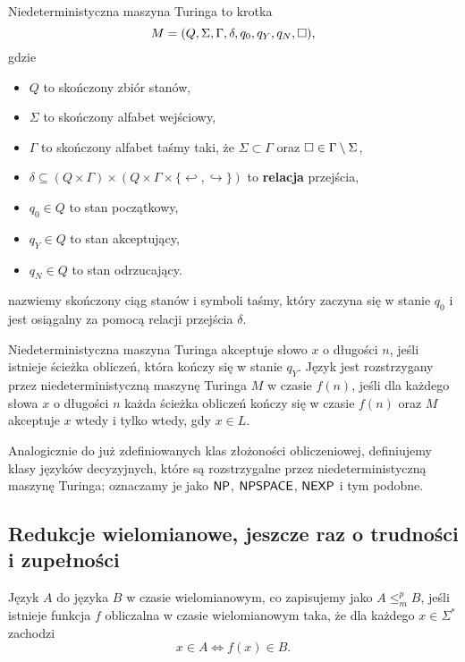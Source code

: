 \begin{definition}
    Niedeterministyczna maszyna Turinga to krotka
    \[ M = (Q, \Sigma, \Gamma, \delta, q_0, q_Y, q_N, \square),\]
    gdzie
    \begin{itemize}[noitemsep]
        \item $Q$ to skończony zbiór stanów,
        \item $\Sigma$ to skończony alfabet wejściowy,
        \item $\Gamma$ to skończony alfabet taśmy taki, że $\Sigma \subset \Gamma$ oraz $\square \in \Gamma \setminus \Sigma$,
        \item $\delta \subseteq \left(Q \times \Gamma\right) \times \left(Q \times \Gamma \times \{\hookleftarrow , \hookrightarrow\}\right)$ to \textbf{relacja}  przejścia,
        \item $q_0 \in Q$ to stan początkowy,
        \item $q_Y \in Q$ to stan akceptujący,
        \item $q_N \in Q$ to stan odrzucający.
    \end{itemize}

     nazwiemy skończony ciąg stanów i symboli taśmy, który zaczyna się w stanie $q_0$ i jest osiągalny za pomocą relacji przejścia $\delta$.

    Niedeterministyczna maszyna Turinga akceptuje słowo $x$ o długości $n$, jeśli istnieje ścieżka obliczeń, która kończy się w stanie $q_Y$. Język jest rozstrzygany przez niedeterministyczną maszynę Turinga $M$ w czasie $f(n)$, jeśli dla każdego słowa $x$ o długości $n$ każda ścieżka obliczeń kończy się w czasie $f(n)$ oraz $M$ akceptuje $x$ wtedy i tylko wtedy, gdy $x \in L$.
\end{definition}

Analogicznie do już zdefiniowanych klas złożoności obliczeniowej, definiujemy klasy języków decyzyjnych, które są rozstrzygalne przez niedeterministyczną maszynę Turinga; oznaczamy je jako $\textsf{NP}$, $\textsf{NPSPACE}$, $\textsf{NEXP}$ i tym podobne.

\subsection{Redukcje wielomianowe, jeszcze raz o trudności i zupełności}

\begin{definition}\label{d:poly reduction}
    Język $A$  do języka $B$ w czasie wielomianowym, co zapisujemy jako $A \leq_m^p B$, jeśli istnieje funkcja $f$ obliczalna w czasie wielomianowym taka, że dla każdego $x \in \Sigma^*$ zachodzi
    \[ x \in A \iff f(x) \in B. \]
\end{definition}

